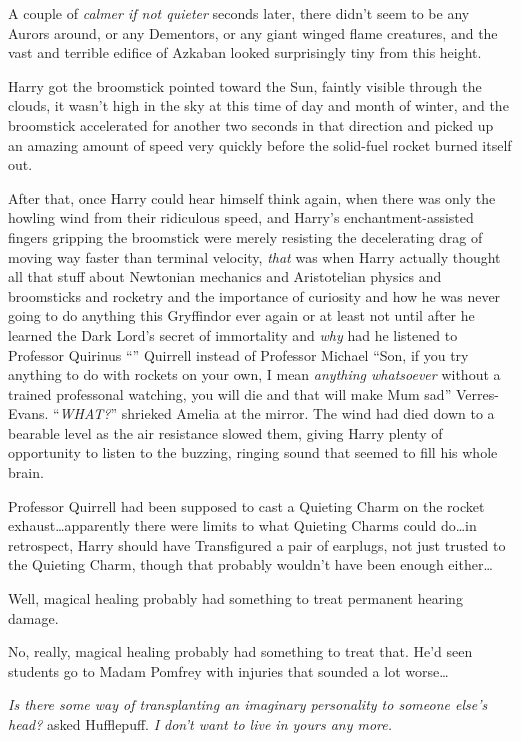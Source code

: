 A couple of \emph{calmer if not quieter} seconds later, there didn’t seem to be
any Aurors around, or any Dementors, or any giant winged flame creatures, and
the vast and terrible edifice of Azkaban looked surprisingly tiny from this
height.

Harry got the broomstick pointed toward the Sun, faintly visible through the
clouds, it wasn’t high in the sky at this time of day and month of winter, and
the broomstick accelerated for another two seconds in that direction and picked
up an amazing amount of speed very quickly before the solid-fuel rocket burned
itself out.

After that, once Harry could hear himself think again, when there was only the
howling wind from their ridiculous speed, and Harry’s enchantment-assisted
fingers gripping the broomstick were merely resisting the decelerating drag of
moving way faster than terminal velocity, \emph{that} was when Harry actually
thought all that stuff about Newtonian mechanics and Aristotelian physics and
broomsticks and rocketry and the importance of curiosity and how he was never
going to do anything this Gryffindor ever again or at least not until after he
learned the Dark Lord’s secret of immortality and \emph{why} had he listened to
Professor Quirinus “” Quirrell instead of Professor Michael
“Son, if you try anything to do with rockets on your own, I mean \emph{anything
whatsoever} without a trained professonal watching, you will die and that will
make Mum sad” Verres-Evans.
\later
“\emph{WHAT?}” shrieked Amelia at the mirror.
\later
The wind had died down to a bearable level as the air resistance slowed them,
giving Harry plenty of opportunity to listen to the buzzing, ringing sound that
seemed to fill his whole brain.

Professor Quirrell had been supposed to cast a Quieting Charm on the rocket
exhaust…apparently there were limits to what Quieting Charms could
do…in retrospect, Harry should have Transfigured a pair of earplugs,
not just trusted to the Quieting Charm, though that probably wouldn’t have been
enough either…

Well, magical healing probably had something to treat permanent hearing damage.

No, really, magical healing probably had something to treat that. He’d seen
students go to Madam Pomfrey with injuries that sounded a lot worse…

\emph{Is there some way of transplanting an imaginary personality to someone
else’s head?} asked Hufflepuff. \emph{I don’t want to live in yours any more.}

